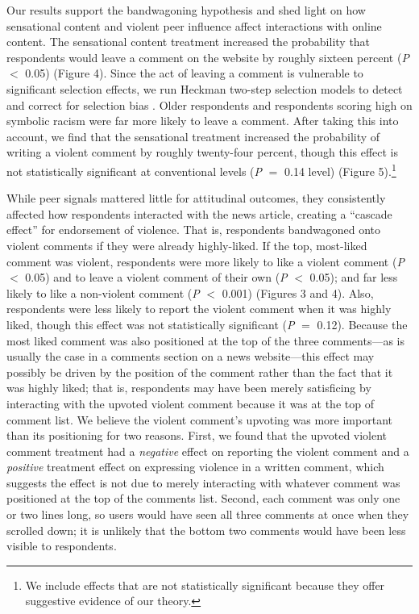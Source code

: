 Our results support the bandwagoning hypothesis and shed light on how sensational content and violent peer influence affect interactions with online content. The sensational content treatment increased the probability that respondents would leave a comment on the website by roughly sixteen percent (\textit{P} $<$ 0.05) (Figure 4). Since the act of leaving a comment is vulnerable to significant selection effects, we run Heckman two-step selection models to detect and correct for selection bias \citep{heckman1979sample}. Older respondents and respondents scoring high on symbolic racism were far more likely to leave a comment. After taking this into account, we find that the sensational treatment increased the probability of writing a violent comment by roughly twenty-four percent, though this effect is not statistically significant at conventional levels (\textit{P} $=$ 0.14 level) (Figure 5).\footnote{We include effects that are not statistically significant because they offer suggestive evidence of our theory.}

While peer signals mattered little for attitudinal outcomes, they consistently affected how respondents interacted with the news article, creating a ``cascade effect'' \citep{bikhchandani1992theory} for endorsement of violence. That is, respondents bandwagoned onto violent comments if they were already highly-liked. If the top, most-liked comment was violent, respondents were more likely to like a violent comment (\textit{P} $<$ 0.05) and to leave a violent comment of their own (\textit{P} $<$ 0.05); and far less likely to like a non-violent comment (\textit{P} $<$ 0.001) (Figures 3 and 4). Also, respondents were less likely to report the violent comment when it was highly liked, though this effect was not statistically significant (\textit{P} $=$ 0.12). Because the most liked comment was also positioned at the top of the three comments---as is usually the case in a comments section on a news website---this effect may possibly be driven by the position of the comment rather than the fact that it was highly liked; that is, respondents may have been merely satisficing by interacting with the upvoted violent comment because it was at the top of comment list. We believe the violent comment's upvoting was more important than its positioning for two reasons. First, we found that the upvoted violent comment treatment had a \textit{negative} effect on reporting the violent comment and a \textit{positive} treatment effect on expressing violence in a written comment, which suggests the effect is not due to merely interacting with whatever comment was positioned at the top of the comments list. Second, each comment was only one or two lines long, so users would have seen all three comments at once when they scrolled down; it is unlikely that the bottom two comments would have been less visible to respondents.

